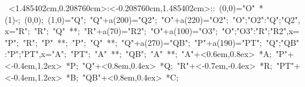 %


\hbox{
\xy    <1.485402cm,0.208760cm>:<-0.208760cm,1.485402cm>::
       (0,0)="O" *\ellipse(1){-}; (0,0); (1,0)="Q";
       "Q"+a(200)="Q2"; "O"+a(220)="O2";
       {"O";"O2":"Q";"Q2",x}="R";
       "R"; "Q" **\dir{-};
       "R"+a(70)="R2"; "O"+a(100)="O3";
       {"O";"O3":"R";"R2",x}="P";
       "R"; "P" **\dir{-}; "P"; "Q" **\dir{-};
       "Q"+a(270)="QB"; "P"+a(190)="PT"; 
       {"Q";"QB":"P";"PT",x}="A";
       "PT"; "A" **\dir{-}; "QB"; "A" **\dir{-};
       "A"+<0.6em,0.8ex> *{A};
       "P"+<-0.4em,1.2ex> *{P};
       "Q"+<0.8em,0.4ex> *{Q};
       "R"+<-0.7em,-0.4ex> *{R};
       "PT"+<-0.4em,1.2ex> *{B};
       "QB"+<0.8em,0.4ex> *{C};
\endxy}



